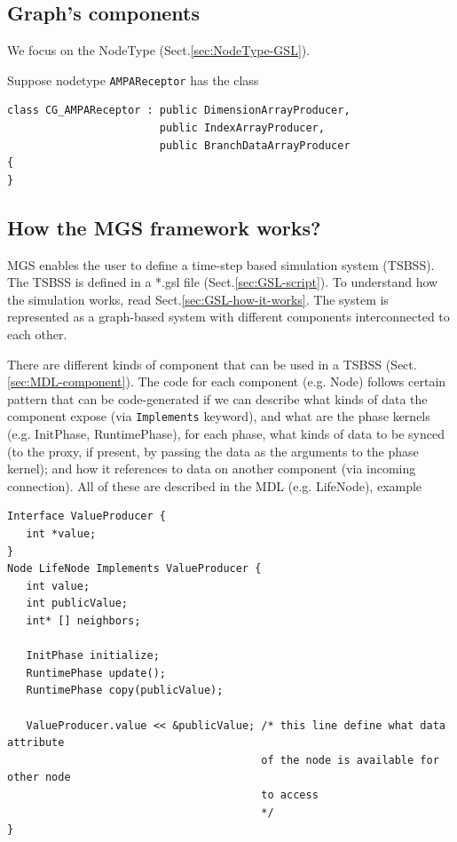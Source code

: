 \subsection{Graph's components}
\label{sec:graph-components}

We focus on the NodeType (Sect.\ref{sec:NodeType-GSL}).

Suppose nodetype \verb!AMPAReceptor! has the class
\begin{verbatim}
class CG_AMPAReceptor : public DimensionArrayProducer, 
                        public IndexArrayProducer,
                        public BranchDataArrayProducer
{
}
\end{verbatim}




\subsection{How the MGS framework works?}
\label{sec:MGS-how-it-works}

MGS enables the user to define a time-step based simulation system (TSBSS).
The TSBSS is defined in a *.gsl file (Sect.\ref{sec:GSL-script}).
To understand how the simulation works, read
Sect.\ref{sec:GSL-how-it-works}.
The system is represented as a graph-based system with different components
interconnected to each other.

There are different kinds of component that can be used in a TSBSS
(Sect.\ref{sec:MDL-component}). The code for each component (e.g. Node) follows
certain pattern that can be code-generated if we can describe what kinds of data
the component expose (via \verb!Implements! keyword), and what are the phase
kernels (e.g. InitPhase, RuntimePhase), for each phase, what kinds of data to be
synced (to the proxy, if present, by passing the data as the arguments to the
phase kernel); and how it references to data on another component (via incoming
connection). All of these are described in the MDL (e.g. LifeNode), example

{\tiny
\begin{verbatim}
Interface ValueProducer {
   int *value;
}
Node LifeNode Implements ValueProducer {
   int value;
   int publicValue;
   int* [] neighbors;

   InitPhase initialize;
   RuntimePhase update();
   RuntimePhase copy(publicValue);

   ValueProducer.value << &publicValue; /* this line define what data attribute
                                        of the node is available for other node
                                        to access 
                                        */
}
\end{verbatim}
}

